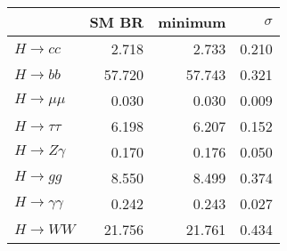 \begin{tabular}{lrrr}
\toprule
{} &  SM BR &  minimum &  $\sigma$ \\
\midrule
$H\to cc$           &  2.718 &    2.733 &     0.210 \\
$H\to bb$           & 57.720 &   57.743 &     0.321 \\
$H\to \mu\mu$       &  0.030 &    0.030 &     0.009 \\
$H\to \tau\tau$     &  6.198 &    6.207 &     0.152 \\
$H\to Z\gamma$      &  0.170 &    0.176 &     0.050 \\
$H\to gg$           &  8.550 &    8.499 &     0.374 \\
$H\to \gamma\gamma$ &  0.242 &    0.243 &     0.027 \\
$H\to WW$           & 21.756 &   21.761 &     0.434 \\
\bottomrule
\end{tabular}
